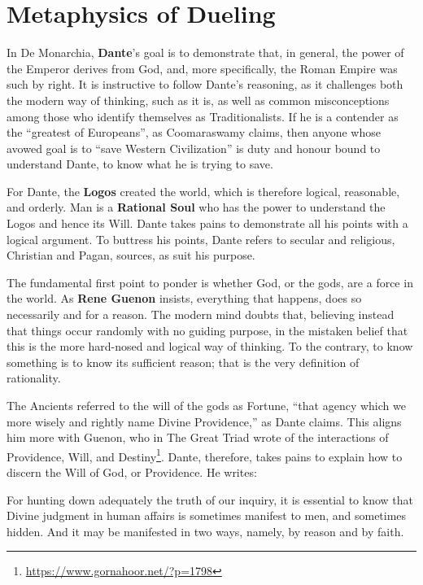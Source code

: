 \section{Metaphysics of Dueling}

In De Monarchia, \textbf{Dante}'s goal is to demonstrate that, in general, the power of the Emperor derives from God, and, more specifically, the Roman Empire was such by right. It is instructive to follow Dante's reasoning, as it challenges both the modern way of thinking, such as it is, as well as common misconceptions among those who identify themselves as Traditionalists. If he is a contender as the ``greatest of Europeans'', as Coomaraswamy claims, then anyone whose avowed goal is to ``save Western Civilization'' is duty and honour bound to understand Dante, to know what he is trying to save.

For Dante, the \textbf{Logos} created the world, which is therefore logical, reasonable, and orderly. Man is a \textbf{Rational Soul} who has the power to understand the Logos and hence its Will. Dante takes pains to demonstrate all his points with a logical argument. To buttress his points, Dante refers to secular and religious, Christian and Pagan, sources, as suit his purpose.

The fundamental first point to ponder is whether God, or the gods, are a force in the world. As \textbf{Rene Guenon} insists, everything that happens, does so necessarily and for a reason. The modern mind doubts that, believing instead that things occur randomly with no guiding purpose, in the mistaken belief that this is the more hard-nosed and logical way of thinking. To the contrary, to know something is to know its sufficient reason; that is the very definition of rationality.

The Ancients referred to the will of the gods as Fortune, ``that agency which we more wisely and rightly name Divine Providence,'' as Dante claims. This aligns him more with Guenon, who in The Great Triad wrote of the interactions of Providence, Will, and Destiny\footnote{\url{https://www.gornahoor.net/?p=1798}}. Dante, therefore, takes pains to explain how to discern the Will of God, or Providence. He writes:

\begin{quotex}
For hunting down adequately the truth of our inquiry, it is essential to know that Divine judgment in human affairs is sometimes manifest to men, and sometimes hidden. And it may be manifested in two ways, namely, by reason and by faith.
\end{quotex}


